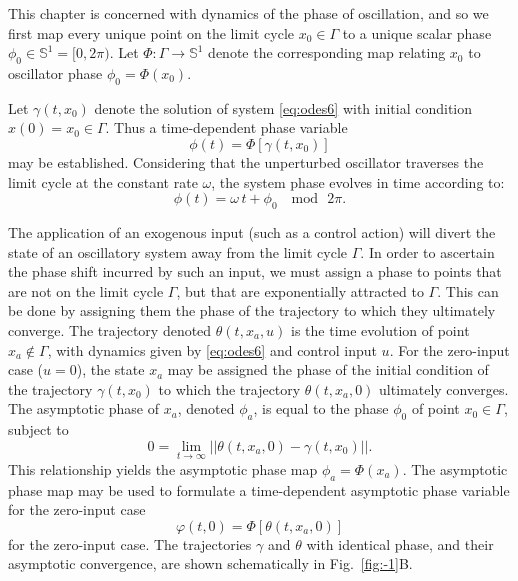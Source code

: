 This chapter is concerned with dynamics of the phase of oscillation, and so we first map every unique point on the limit cycle $x_0\in\Gamma$ to a unique scalar phase $\phi_0\in\mathbb{S}^1=[0,2\pi)$.
Let $\Phi : \Gamma \to \mathbb{S}^1$ denote the corresponding map relating $x_0$ to oscillator phase $\phi_0 = \Phi(x_0)$.

Let $\gamma(t, x_0)$ denote the solution of system \eqref{eq:odes6} with initial condition $x(0) = x_0\in\Gamma$.
Thus a time-dependent phase variable
\begin{equation}
    \phi(t) = \Phi[\gamma(t,x_0)]
\end{equation}
may be established.
Considering that the unperturbed oscillator traverses the limit cycle at the constant rate $\omega$, the system phase evolves in time according to:
\begin{equation}
    \label{eq:phasevar1}
    \phi(t) = \omega\,t+\phi_0 \; \mod\, 2\pi.
\end{equation}


The application of an exogenous input (such as a control action) will divert the state of an oscillatory system away from the limit cycle $\Gamma$.
In order to ascertain the phase shift incurred by such an input, we must assign a phase to points that are not on the limit cycle $\Gamma$, but that are exponentially attracted to $\Gamma$.
This can be done by assigning them the phase of the trajectory to which they ultimately converge.
The trajectory denoted $\theta(t,x_a,u)$ is the time evolution of point $x_a\notin\Gamma$, with dynamics given by \eqref{eq:odes6} and control input $u$.
For the zero-input case ($u=0$), the state $x_a$ may be assigned the phase of the initial condition of the trajectory $\gamma(t, x_0)$ to which the trajectory $\theta(t,x_a,0)$ ultimately converges.
The asymptotic phase of $x_a$, denoted $\phi_a$, is equal to the phase $\phi_0$ of point $x_0\in\Gamma$, subject to
\begin{equation}
    0 = \lim_{t\to\infty}||\theta(t, x_a,0) - \gamma(t, x_0)||.
\end{equation}
This relationship yields the asymptotic phase map $\phi_a = \mathit{\Phi}(x_a)$.
The asymptotic phase map may be used to formulate a time-dependent asymptotic phase variable for the zero-input case
\begin{equation}
    \varphi(t,0) = \mathit{\Phi}[\theta(t,x_a,0)]
\end{equation}
for the zero-input case.
The trajectories $\gamma$ and $\theta$ with identical phase, and their asymptotic convergence, are shown schematically in Fig.~\ref{fig:-1}B.



